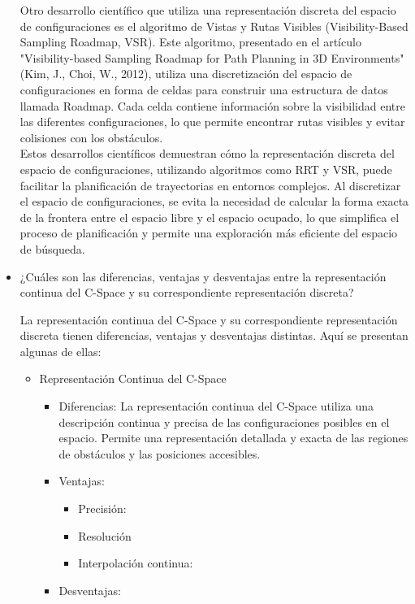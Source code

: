 \documentclass{article}
\begin{document}
\begin{itemize}
  Otro desarrollo científico que utiliza una representación discreta del espacio de configuraciones es el algoritmo de Vistas y Rutas Visibles (Visibility-Based Sampling Roadmap, VSR). Este algoritmo, presentado en el artículo "Visibility-based Sampling Roadmap for Path Planning in 3D Environments" (Kim, J., Choi, W., 2012), utiliza una discretización del espacio de configuraciones en forma de celdas para construir una estructura de datos llamada Roadmap. Cada celda contiene información sobre la visibilidad entre las diferentes configuraciones, lo que permite encontrar rutas visibles y evitar colisiones con los obstáculos.\\

  Estos desarrollos científicos demuestran cómo la representación discreta del espacio de configuraciones, utilizando algoritmos como RRT y VSR, puede facilitar la planificación de trayectorias en entornos complejos. Al discretizar el espacio de configuraciones, se evita la necesidad de calcular la forma exacta de la frontera entre el espacio libre y el espacio ocupado, lo que simplifica el proceso de planificación y permite una exploración más eficiente del espacio de búsqueda.
  
\item {¿Cuáles son las diferencias, ventajas y desventajas entre la representación continua del C-Space y su correspondiente representación discreta?}

  La representación continua del C-Space y su correspondiente representación discreta tienen diferencias, ventajas y desventajas distintas. Aquí se presentan algunas de ellas:
  \begin{itemize}
  \item Representación Continua del C-Space
    \begin{itemize}
    \item Diferencias: La representación continua del C-Space utiliza una descripción continua y precisa de las configuraciones posibles en el espacio. Permite una representación detallada y exacta de las regiones de obstáculos y las posiciones accesibles.
    \item Ventajas:
      \begin{itemize}
      \item Precisión:
      \item Resolución
        \item Interpolación continua:
      \end{itemize}
    \item Desventajas:
      

\end{itemize}
\end{itemize}
\end{itemize}
\end{document}

